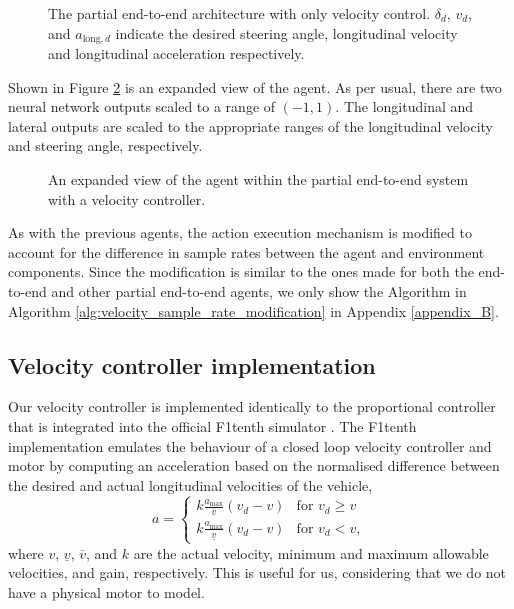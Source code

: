 \begin{figure}[htb!]
    \centering
    
    \caption[The partial end-to-end architecture with only velocity control]{The partial end-to-end architecture with only velocity control. $\delta_{d}$, $v_{d}$, and $a_{\text{long},d}$ indicate the desired steering angle, longitudinal velocity and longitudinal acceleration respectively.}
    \label{fig:vel_architecture}
\end{figure}

Shown in Figure \ref{fig:vel_agent} is an expanded view of the agent.
As per usual, there are two neural network outputs scaled to a range of $(-1,1)$.
The longitudinal and lateral outputs are scaled to the appropriate ranges of the longitudinal velocity and steering angle, respectively.

\begin{figure}[htb!]
    \centering
    
    \caption[An expanded view of the agent within the partial end-to-end system with a velocity controller]{An expanded view of the agent within the partial end-to-end system with a velocity controller.}
    \label{fig:vel_agent}
\end{figure}

As with the previous agents, the action execution mechanism is modified to account for the difference in sample rates between the agent and environment components.
Since the modification is similar to the ones made for both the end-to-end and other partial end-to-end agents, we only show the Algorithm in Algorithm \ref{alg:velocity_sample_rate_modification} in Appendix \ref{appendix_B}.

\subsection{Velocity controller implementation}\label{sec:velocity_controller_implementation}
Our velocity controller is implemented identically to the proportional controller that is integrated into the official F1tenth simulator \cite{f1tenth}.
The F1tenth implementation emulates the behaviour of a closed loop velocity controller and motor by computing an acceleration based on the normalised difference between the desired and actual longitudinal velocities of the vehicle,
\begin{equation}
    a = 
    \begin{cases}
        k \frac{a_{\text{max}}}{\overline{v}}(v_d - v) & \text{for } v_d \geq v\\
        k \frac{a_{\text{max}}}{\underline{v}}(v_d - v) & \text{for } v_d < v,
    \end{cases}
\label{eq:vel_control}
\end{equation}
where $v$, $\underline{v}$, $\overline{v}$, and $k$ are the actual velocity, minimum and maximum allowable velocities, and gain, respectively.
This is useful for us, considering that we do not have a physical motor to model.

